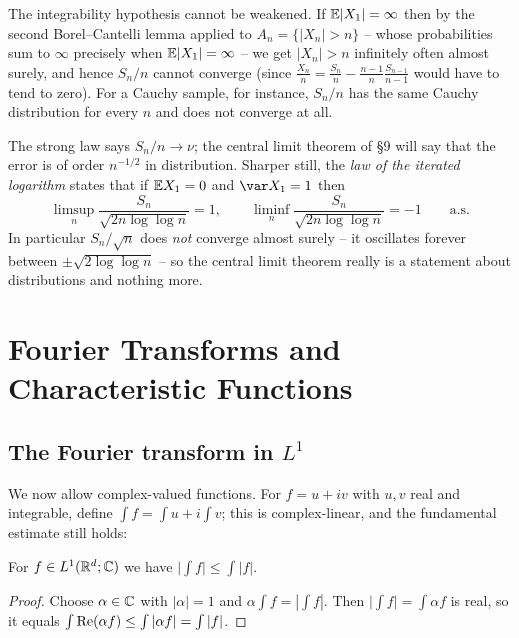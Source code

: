\documentclass[a4paper]{scrartcl}
\begin{document}
\begin{remark}
	The integrability hypothesis cannot be weakened. If $\mathbb{E}|X_1|=\infty$ then by the second Borel--Cantelli lemma applied to $A_n = \{|X_n|>n\}$ -- whose probabilities sum to $\infty$ precisely when $\mathbb{E}|X_1|=\infty$ -- we get $|X_n|>n$ infinitely often almost surely, and hence $S_n/n$ cannot converge (since $\frac{X_n}{n} = \frac{S_n}{n}-\frac{n-1}{n}\frac{S_{n-1}}{n-1}$ would have to tend to zero). For a Cauchy sample, for instance, $S_n/n$ has the same Cauchy distribution for every $n$ and does not converge at all.
\end{remark}

\begin{remark}
	The strong law says $S_n/n \to \nu$; the central limit theorem of \S9 will say that the error is of order $n^{-1/2}$ in distribution. Sharper still, the \emph{law of the iterated logarithm} states that if $\mathbb{E} X_1 = 0$ and $\var X_1 = 1$ then
	$$
	\limsup_n \frac{S_n}{\sqrt{2n\log\log n}} = 1, \qquad \liminf_n \frac{S_n}{\sqrt{2n\log\log n}}=-1 \qquad \text{a.s.}
	$$
	In particular $S_n/\sqrt n$ does \emph{not} converge almost surely -- it oscillates forever between $\pm\sqrt{2\log\log n}$ -- so the central limit theorem really is a statement about distributions and nothing more.
\end{remark}
\section{Fourier Transforms and Characteristic Functions}

\subsection{The Fourier transform in \texorpdfstring{$L^1$}{L1}}

We now allow complex-valued functions. For $f = u + iv$ with $u,v$ real and integrable, define $\int f = \int u + i\int v$; this is complex-linear, and the fundamental estimate still holds:

\begin{lemma}
	For $f \in L^1(\mathbb{R}^d;\mathbb{C})$ we have $\big|\int f\big| \leq \int|f|$.
\end{lemma}
\begin{proof}
	Choose $\alpha \in \mathbb{C}$ with $|\alpha|=1$ and $\alpha\int f = |\int f|$. Then $\big|\int f\big| = \int \alpha f$ is real, so it equals $\int \operatorname{Re}(\alpha f) \leq \int |\alpha f| = \int|f|$.
\end{proof}
\end{document}
